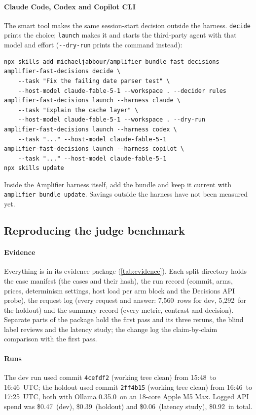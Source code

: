 \documentclass[11pt,letterpaper]{article}
\newcommand{\code}[1]{\texttt{#1}}
\newcommand{\opt}[1]{\texttt{-{}-#1}}
\newcommand{\DevCommit}{4cefdf2}
\newcommand{\DevDirty}{clean}
\newcommand{\DevEnded}{16:46}
\newcommand{\DevRequestsLogged}{7{,}560}
\newcommand{\DevSpendUSD}{0.47}
\newcommand{\DevStarted}{15:48}
\newcommand{\HoldCPUs}{18}
\newcommand{\HoldCommit}{2ff4b15}
\newcommand{\HoldDirty}{clean}
\newcommand{\HoldEnded}{17:25}
\newcommand{\HoldOllama}{0.35.0}
\newcommand{\HoldRequestsLogged}{5{,}292}
\newcommand{\HoldSpendUSD}{0.39}
\newcommand{\HoldStarted}{16:46}
\newcommand{\LatencySpendUSD}{0.06}
\newcommand{\LoggedSpendTotal}{0.92}
\begin{document}
\paragraph{Claude Code, Codex and Copilot CLI} The smart tool makes the same session-start decision outside the
harness. \code{decide} prints the choice; \code{launch} makes it and starts the third-party agent with that model and
effort (\opt{dry-run} prints the command instead):
\begin{lstlisting}[basicstyle=\ttfamily\footnotesize, frame=single, rulecolor=\color{okgray}]
npx skills add michaeljabbour/amplifier-bundle-fast-decisions
amplifier-fast-decisions decide \
    --task "Fix the failing date parser test" \
    --host-model claude-fable-5-1 --workspace . --decider rules
amplifier-fast-decisions launch --harness claude \
    --task "Explain the cache layer" \
    --host-model claude-fable-5-1 --workspace . --dry-run
amplifier-fast-decisions launch --harness codex \
    --task "..." --host-model claude-fable-5-1
amplifier-fast-decisions launch --harness copilot \
    --task "..." --host-model claude-fable-5-1
npx skills update
\end{lstlisting}
Inside the Amplifier harness itself, add the bundle and keep it current with \code{amplifier bundle update}. Savings
outside the harness have not been measured yet.
\subsection{Reproducing the judge benchmark}\label{jb:sec:repro}

\paragraph{Evidence} Everything is in its evidence package (\cref{tab:evidence}). Each split
directory holds the case manifest (the cases and their hash), the run record (commit, arms, prices,
determinism settings, host load per arm block and the Decisions API probe), the request log
(every request and answer: \DevRequestsLogged\ rows for dev, \HoldRequestsLogged\ for the holdout) and
the summary record (every metric, contrast and decision). Separate parts of the package hold the first pass
and its three reruns, the blind label reviews and the latency study;
the change log the claim-by-claim comparison with the first pass.

\paragraph{Runs} The dev run used commit \code{\DevCommit} (working tree \DevDirty) from \DevStarted\ to
\DevEnded\ UTC; the holdout used commit \code{\HoldCommit} (working tree \HoldDirty) from \HoldStarted\ to
\HoldEnded\ UTC, both with Ollama \HoldOllama\ on an \HoldCPUs-core Apple M5 Max. Logged API spend was
\$\DevSpendUSD\ (dev), \$\HoldSpendUSD\ (holdout) and \$\LatencySpendUSD\ (latency study),
\$\LoggedSpendTotal\ in total.
\end{document}
